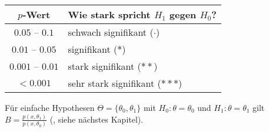 \begin{Bem}
    \begin{tabular}{cl}
        \toprule
        \textbf{$p$-Wert} & \textbf{Wie stark spricht $H_1$ gegen $H_0$?}\\
        \midrule
        $\num{0.05}$ -- $\num{0.1}$ & schwach signifikant ($\cdot$)\\
        \midrule
        $\num{0.01}$ -- $\num{0.05}$ & signifikant ($\ast$)\\
        \midrule
        $\num{0.001}$ -- $\num{0.01}$ & stark signifikant ($\ast\ast$)\\
        \midrule
        $< \num{0.001}$ & sehr stark signifikant ($\ast{\ast}\ast$)\\
        \bottomrule
    \end{tabular}
\end{Bem}

\vspace{5mm}
\linie

\begin{Bem}
    Für einfache Hypothesen $\Theta = \{\theta_0, \theta_1\}$ mit $H_0\colon \theta = \theta_0$
    und $H_1\colon \theta = \theta_1$ gilt
    $B = \frac{p(x, \theta_1)}{p(x, \theta_0)}$
    (, siehe nächstes Kapitel).
\end{Bem}

\pagebreak

